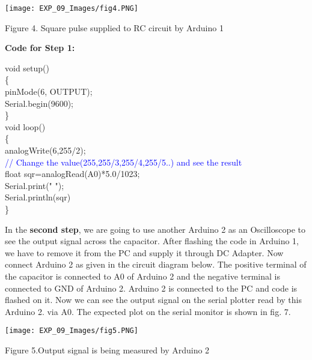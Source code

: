 \documentclass[12pt,a4paper]{article}
\begin{document}
\begin{justify}
\begin{center} 
\texttt{[image: EXP\_09\_Images/fig4.PNG]}
\end{center}
\begin{center} {Figure 4. Square pulse supplied to RC circuit by  Arduino 1}\end{center}

\end{justify}


\hspace{2cm}\textbf{\large Code for Step 1:}\\[6pt]
\setlength{\parindent}{10eM}

  void setup() \\
  \{\\
 pinMode(6, OUTPUT);\\
  Serial.begin(9600);\\
\}\\[12pt]

void loop() \\
\{  \\                  
  analogWrite(6,255/2); \\
     \hspace{12pt}\textcolor{blue}{ // Change the value(255,255/3,255/4,255/5..) and see the result}\\
    float sqr=analogRead(A0)*5.0/1023;\\
    Serial.print(" ");\\
    Serial.println(sqr)\\
\}
\begin{justify}
\noindent In the \textbf{ second step}, we are going to use another Arduino 2 as an Oscilloscope to see the output signal across the capacitor. After flashing the code in  Arduino 1, we have to remove it from the PC and supply it through DC Adapter. Now connect Arduino 2 as given in the circuit diagram below. The positive terminal of the capacitor is connected to A0 of Arduino 2 and the negative terminal is connected to GND of Arduino 2. Arduino 2 is connected to the  PC and code is flashed on it. Now we can see the output signal on the serial plotter read by this Arduino 2. via A0. The expected plot on the serial monitor is shown in fig. 7. \end{justify}

\begin{center} 
\texttt{[image: EXP\_09\_Images/fig5.PNG]}
\end{center}
\begin{center} {Figure 5.Output signal is being measured by Arduino 2}\end{center}
\end{document}
